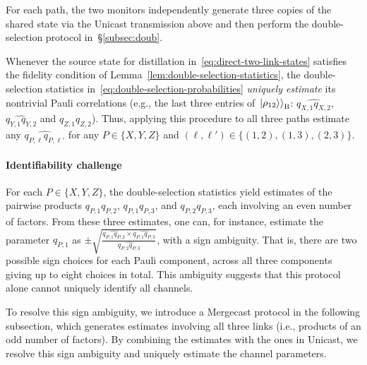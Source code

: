 For each path, the two monitors independently generate three copies
of the shared state via the Unicast transmission above and then perform the double-selection protocol in~\S\ref{subsec:doub}.

Whenever the source state for distillation in~\eqref{eq:direct-two-link-states} satisfies the fidelity condition of
Lemma~\ref{lem:double-selection-statistics},
the double-selection
statistics in~\eqref{eq:double-selection-probabilities} \emph{uniquely estimate} its nontrivial Pauli correlations (e.g., the last three entries of \(\left. \left|\rho_{12}\right\rangle \right \rangle_{\mathrm B}\):
\(\widehat{q_{X,1}q_{X,2}}\),
\(\widehat{q_{Y,1}q_{Y,2}}\)
and \(\widehat{q_{Z,1}q_{Z,2}}\)). Thus, applying this
procedure to all three paths estimate any \(\widehat{q_{P, \ell}q_{P,\ell'}}\)
for any \(P\in\{X,Y,Z\}\)
and \((\ell, \ell') \in \{(1,2), (1,3), (2,3)\}\).




\paragraph{Identifiability challenge}

For each $P\in\{X,Y,Z\}$, the double-selection statistics yield
estimates of the pairwise products
$q_{P,1}q_{P,2}$, $q_{P,1}q_{P,3}$, and $q_{P,2}q_{P,3}$,
each involving an even number of factors.
From these three estimates, one can, for instance, estimate
the parameter $q_{P,1}$ as
$\pm\sqrt{
        \frac{
            \widehat{q_{P,1}q_{P,2}} \times \widehat{q_{P,1}q_{P,3}}
        }{
            \widehat{q_{P,2}q_{P,3}}
        }
    }$, with a sign ambiguity.
That is, there are two possible sign choices for each Pauli component,
across all three components giving up to eight choices in total.
This ambiguity suggests that this protocol alone cannot uniquely
identify all channels.


To resolve this sign ambiguity, we introduce a
Mergecast protocol in the following subsection,
which  generates estimates involving
all three links (i.e., products of an odd number of factors).
By combining the estimates with the ones in Unicast, we resolve
this sign ambiguity and uniquely estimate the channel parameters.


